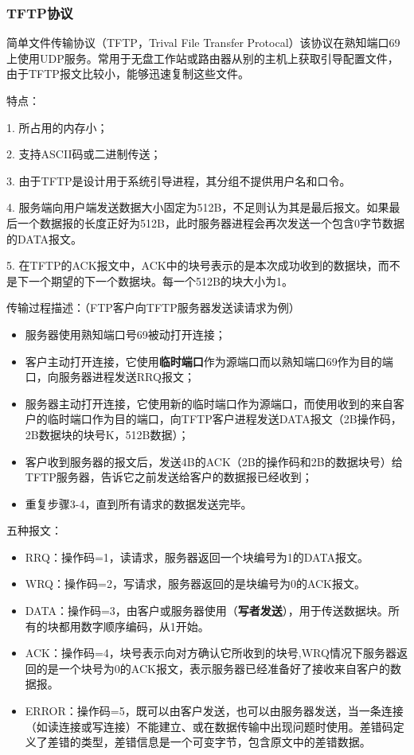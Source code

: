 \documentclass[UTF8]{article}%
\begin{document}
\subsubsection{TFTP协议}

简单文件传输协议（TFTP，Trival File Transfer Protocal）该协议在熟知端口69上使用UDP服务。常用于无盘工作站或路由器从别的主机上获取引导配置文件，由于TFTP报文比较小，能够迅速复制这些文件。

特点：

1. 所占用的内存小；

2. 支持ASCII码或二进制传送；

3. 由于TFTP是设计用于系统引导进程，其分组不提供用户名和口令。

4. 服务端向用户端发送数据大小固定为512B，不足则认为其是最后报文。如果最后一个数据报的长度正好为512B，此时服务器进程会再次发送一个包含0字节数据的DATA报文。

5. 在TFTP的ACK报文中，ACK中的块号表示的是本次成功收到的数据块，而不是下一个期望的下一个数据块。每一个512B的块大小为1。

传输过程描述：（FTP客户向TFTP服务器发送读请求为例）

\begin{itemize}
    \item 服务器使用熟知端口号69被动打开连接；
    \item 客户主动打开连接，它使用\textbf{临时端口}作为源端口而以熟知端口69作为目的端口，向服务器进程发送RRQ报文；
    \item 服务器主动打开连接，它使用新的临时端口作为源端口，而使用收到的来自客户的临时端口作为目的端口，向TFTP客户进程发送DATA报文（2B操作码，2B数据块的块号K，512B数据）；
    \item 客户收到服务器的报文后，发送4B的ACK（2B的操作码和2B的数据块号）给TFTP服务器，告诉它之前发送给客户的数据报已经收到；
    \item 重复步骤3-4，直到所有请求的数据发送完毕。
\end{itemize}

五种报文：

\begin{itemize}
    \item RRQ：操作码=1，读请求，服务器返回一个块编号为1的DATA报文。
    \item WRQ：操作码=2，写请求，服务器返回的是块编号为0的ACK报文。
    \item DATA：操作码=3，由客户或服务器使用（\textbf{写者发送}），用于传送数据块。所有的块都用数字顺序编码，从1开始。
    \item ACK：操作码=4，块号表示向对方确认它所收到的块号,WRQ情况下服务器返回的是一个块号为0的ACK报文，表示服务器已经准备好了接收来自客户的数据报。
    \item ERROR：操作码=5，既可以由客户发送，也可以由服务器发送，当一条连接（如读连接或写连接）不能建立、或在数据传输中出现问题时使用。差错码定义了差错的类型，差错信息是一个可变字节，包含原文中的差错数据。
\end{itemize}
\end{document}
